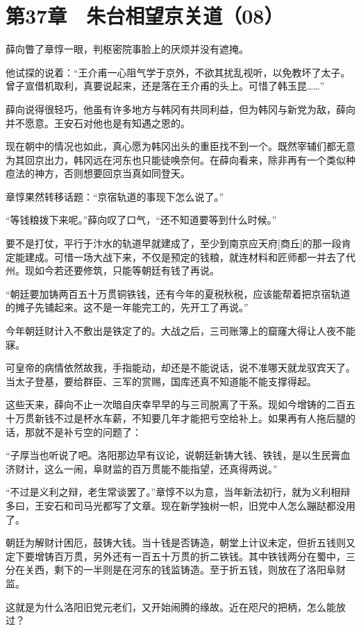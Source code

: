 \section{第37章　朱台相望京关道（08）}

薛向瞥了章惇一眼，判枢密院事脸上的厌烦并没有遮掩。

他试探的说着：“王介甫一心阻气学于京外，不欲其扰乱视听，以免教坏了太子。曾子宣借机取利，真要说起来，还是落在王介甫的头上。可惜了韩玉昆……”

薛向说得很轻巧，他虽有许多地方与韩冈有共同利益，但为韩冈与新党为敌，薛向并不愿意。王安石对他也是有知遇之恩的。

现在朝中的情况也如此，真心愿为韩冈出头的重臣找不到一个。既然宰辅们都无意为其回京出力，韩冈远在河东也只能徒唤奈何。在薛向看来，除非再有一个类似种痘法的神方，否则想要回京当真如同登天。

章惇果然转移话题：“京宿轨道的事现下怎么说了。”

“等钱粮拨下来呢。”薛向叹了口气，“还不知道要等到什么时候。”

要不是打仗，平行于汴水的轨道早就建成了，至少到南京应天府[商丘]的那一段肯定能建成。可惜一场大战下来，不仅是预定的钱粮，就连材料和匠师都一并去了代州。现如今若还要修筑，只能等朝廷有钱了再说。

“朝廷要加铸两百五十万贯铜铁钱，还有今年的夏税秋税，应该能帮着把京宿轨道的摊子先铺起来。这不是一年能完工的，先开工了再说。”

今年朝廷财计入不敷出是铁定了的。大战之后，三司账簿上的窟窿大得让人夜不能寐。

可皇帝的病情依然故我，手指能动，却还是不能说话，说不准哪天就龙驭宾天了。当太子登基，要给群臣、三军的赏赐，国库还真不知道能不能支撑得起。

这些天来，薛向不止一次暗自庆幸早早的与三司脱离了干系。现如今增铸的二百五十万贯新钱不过是杯水车薪，不知要几年才能把亏空给补上。如果再有人拖后腿的话，那就不是补亏空的问题了：

“子厚当也听说了吧。洛阳那边早有议论，说朝廷新铸大钱、铁钱，是以生民膏血济财计，这么一闹，阜财监的百万贯能不能指望，还真得两说。”

“不过是义利之辩，老生常谈罢了。”章惇不以为意，当年新法初行，就为义利相辩多曰，王安石和司马光都写了文章。现在新学独树一帜，旧党中人怎么蹦跶都没用了。

朝廷为解财计困厄，鼓铸大钱。当十钱是否铸造，朝堂上计议未定，但折五钱则又定下要增铸百万贯，另外还有一百五十万贯的折二铁钱。其中铁钱两分在蜀中，三分在关西，剩下的一半则是在河东的钱监铸造。至于折五钱，则放在了洛阳阜财监。

这就是为什么洛阳旧党元老们，又开始闹腾的缘故。近在咫尺的把柄，怎么能放过？

